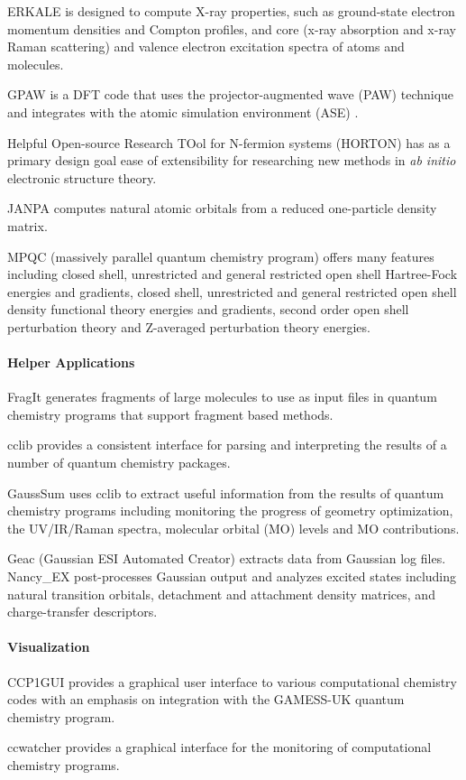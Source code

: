 ERKALE \cite{Lehtola_2012} is designed to compute X-ray properties, such as ground-state electron momentum densities and Compton profiles, and core (x-ray absorption and x-ray Raman scattering) and valence electron excitation spectra of atoms and molecules.

GPAW \cite{gpaw} is a DFT code that uses the projector-augmented wave (PAW) technique \cite{Bl_chl_1994,Kresse_1999} and integrates with the  atomic simulation environment (ASE)  \cite{Bahn_2002}. 

Helpful Open-source Research TOol for N-fermion systems (HORTON) has as a primary design goal ease of extensibility for researching new methods in \textit{ab initio} electronic structure theory.

JANPA \cite{Nikolaienko_2014} computes natural atomic orbitals from a reduced one-particle density matrix.

MPQC (massively parallel quantum chemistry program) \cite{Janssen95} offers many features including closed shell, unrestricted and general restricted open shell Hartree-Fock energies and gradients, closed shell, unrestricted and general restricted open shell density functional theory energies and gradients, second order open shell perturbation theory and Z-averaged perturbation theory energies.





\paragraph{Helper Applications}
FragIt \cite{Steinmann_2012} generates fragments of large molecules to use as input files in quantum chemistry programs that support fragment based methods.

cclib \cite{O_boyle_2008} provides a consistent interface for parsing and interpreting the results of a number of quantum chemistry packages. 

GaussSum \cite{O_boyle_2008} uses cclib to extract useful information from the results of quantum chemistry programs including monitoring the progress of geometry optimization, the UV/IR/Raman spectra, molecular orbital (MO) levels and MO contributions.

Geac (Gaussian ESI Automated Creator) extracts data from Gaussian log files. 
Nancy\_EX \cite{Etienne_2014} post-processes Gaussian output and analyzes excited states including natural transition orbitals, detachment and attachment density matrices, and charge-transfer descriptors.


\paragraph{Visualization}
CCP1GUI provides a graphical user interface to various computational chemistry codes with an emphasis on integration with the GAMESS-UK quantum chemistry program.

ccwatcher provides a graphical interface for the monitoring of computational chemistry programs.
